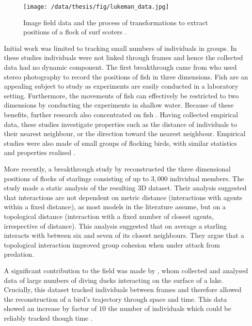 \begin{figure}
	\centering
	\texttt{[image: /data/thesis/fig/lukeman\_data.jpg]}
	\caption{Image field data and the process of transformations to extract positions of a flock of surf scoters \citep{lukeman10}.}
	\label{fig:lukeman_data}
\end{figure}

Initial work was limited to tracking small numbers of individuals in groups. In these studies individuals were not linked through frames and hence the collected data had no dynamic component. The first breakthrough came from \citet{cullen65} who used stereo photography to record the positions of fish in three dimensions. Fish are an appealing subject to study as experiments are easily conducted in a laboratory setting. Furthermore, the movements of fish can effectively be restricted to two dimensions by conducting the experiments in shallow water. Because of these benefits, further research also concentrated on fish \citep{van_long85, partridge80}. Having collected empirical data, these studies investigate properties such as the distance of individuals to their nearest neighbour, or the direction toward the nearest neighbour. Empirical studies were also made of small groups of flocking birds, with similar statistics and properties realised \citep{major78, budgey98}.

More recently, a breakthrough study by \citet{ballerini08} reconstructed the three dimensional positions of flocks of starlings consisting of up to $3,000$ individual members. The study made a static analysis of the resulting 3D dataset. Their analysis suggested that interactions are not dependent on metric distance (interactions with agents within a fixed distance), as most models in the literature assume, but on a topological distance (interaction with a fixed number of closest agents, irrespective of distance). This analysis suggested that on average a starling interacts with between six and seven of its closest neighbours. They argue that a topological interaction improved group cohesion when under attack from predation.

A significant contribution to the field was made by \citet{lukeman10}, whom collected and analysed data of large numbers of diving ducks interacting on the surface of a lake. Crucially, this dataset tracked individuals between frames and therefore allowed the reconstruction of a bird's trajectory through space and time. This data showed an increase by factor of $10$ the number of individuals which could be reliably tracked though time \citep{lukeman09}.

